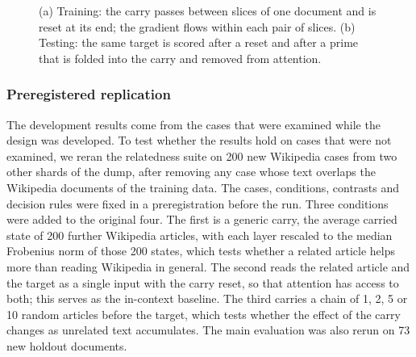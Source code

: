 \documentclass[10pt]{article} %
\begin{document}
\begin{figure}[t]
\centering
{}
\caption{(a) Training: the carry passes between slices of one document and is reset at its end; the gradient flows within each pair of slices. (b) Testing: the same target is scored after a reset and after a prime that is folded into the carry and removed from attention.}

\label{fig-protocol}
\end{figure}

\subsubsection{Preregistered replication}
\label{sec-confirmatory-method}

The development results come from the cases that were examined while the design was developed. To test whether the results hold on cases that were not examined, we reran the relatedness suite on 200 new Wikipedia cases from two other shards of the dump, after removing any case whose text overlaps the Wikipedia documents of the training data.
The cases, conditions, contrasts and decision rules were fixed in a preregistration \citep{nosek2018preregistration} before the run. Three conditions were added to the original four. The first is a generic carry, the average carried state of 200 further Wikipedia articles, with each layer rescaled to the median Frobenius norm of those 200 states, which tests whether a related article helps more than reading Wikipedia in general. The second reads the related article and the target as a single input with the carry reset, so that attention has access to both; this serves as the in-context baseline. The third carries a chain of 1, 2, 5 or 10 random articles before the target, which tests whether the effect of the carry changes as unrelated text accumulates. The main evaluation was also rerun on 73 new holdout documents.
\end{document}
